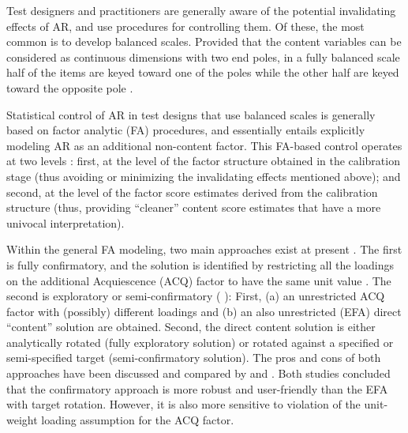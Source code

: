 Test designers and practitioners are generally aware of the potential invalidating effects of AR, and use procedures for controlling them. Of these, the most common is to develop balanced scales. Provided that the content variables can be considered as continuous dimensions with two end poles, in a fully balanced scale half of the items are keyed toward one of the poles while the other half are keyed toward the opposite pole  \citep{Savalei:2014,Vigil-Colet:2020}.

Statistical control of AR in test designs that use balanced scales is generally based on factor analytic (FA) procedures, and essentially entails explicitly modeling AR as an additional non-content factor. This FA-based control operates at two levels \citep[see][]{Ferrando:2003}: first, at the level of the factor structure obtained in the calibration stage (thus avoiding or minimizing the invalidating effects mentioned above); and second, at the level of the factor score estimates derived from the calibration structure (thus, providing “cleaner” content score estimates that have a more univocal interpretation).

Within the general FA modeling, two main approaches exist at present  \citep{Savalei:2014,delaFuente:2020}. The first is fully confirmatory, and the solution is identified by restricting all the loadings on the additional Acquiescence (ACQ) factor to have the same unit value  \citep{Billiet:2000}. The second is exploratory or semi-confirmatory ( \citep{Ferrando:2003}): First, (a) an unrestricted ACQ factor with (possibly) different loadings and (b) an also unrestricted (EFA) direct “content” solution are obtained. Second, the direct content solution is either analytically rotated (fully exploratory solution) or rotated against a specified or semi-specified target (semi-confirmatory solution). The pros and cons of both approaches have been discussed and compared by \citet{Savalei:2014} and \citet{delaFuente:2020}. Both studies concluded that the confirmatory approach is more robust and user-friendly than the EFA with target rotation. However, it is also more sensitive to violation of the unit-weight loading assumption for the ACQ factor.


